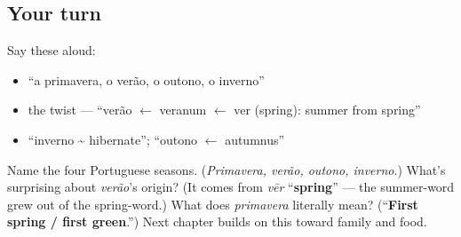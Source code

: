 \subsection*{Your turn}
Say these aloud:

\begin{itemize}
\raggedright
  \item \textquotedblleft{}a primavera, o verão, o outono, o inverno\textquotedblright{}
  \item the twist — \textquotedblleft{}verão $\leftarrow$ veranum $\leftarrow$ ver (spring): summer from spring\textquotedblright{}
  \item \textquotedblleft{}inverno \textasciitilde{} hibernate\textquotedblright{}; \textquotedblleft{}outono $\leftarrow$ autumnus\textquotedblright{}
\end{itemize}

\begin{tcolorbox}[breakable,colback=teal!4,colframe=teal!35!black,title={Before you move on}]
Name the four Portuguese seasons. (\emph{Primavera, verão, outono, inverno}.) What's surprising about \emph{verão}'s origin? (It comes from \emph{vēr} \textquotedblleft{}\textbf{spring}\textquotedblright{} — the summer-word grew out of the spring-word.) What does \emph{primavera} literally mean? (\textquotedblleft{}\textbf{First spring / first green}.\textquotedblright{}) Next chapter builds on this toward family and food.
\end{tcolorbox}
